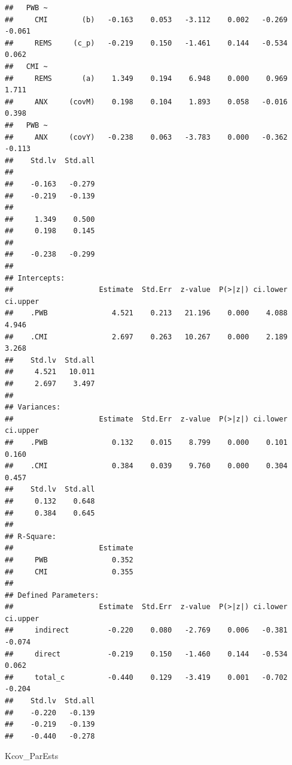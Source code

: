 \documentclass[
  11pt,
]{book}
\newenvironment{Shaded}{\begin{snugshade}}{\end{snugshade}}
\newcommand{\NormalTok}[1]{#1}
\begin{document}
\begin{verbatim}
##   PWB ~                                                                 
##     CMI        (b)   -0.163    0.053   -3.112    0.002   -0.269   -0.061
##     REMS     (c_p)   -0.219    0.150   -1.461    0.144   -0.534    0.062
##   CMI ~                                                                 
##     REMS       (a)    1.349    0.194    6.948    0.000    0.969    1.711
##     ANX     (covM)    0.198    0.104    1.893    0.058   -0.016    0.398
##   PWB ~                                                                 
##     ANX     (covY)   -0.238    0.063   -3.783    0.000   -0.362   -0.113
##    Std.lv  Std.all
##                   
##    -0.163   -0.279
##    -0.219   -0.139
##                   
##     1.349    0.500
##     0.198    0.145
##                   
##    -0.238   -0.299
## 
## Intercepts:
##                    Estimate  Std.Err  z-value  P(>|z|) ci.lower ci.upper
##    .PWB               4.521    0.213   21.196    0.000    4.088    4.946
##    .CMI               2.697    0.263   10.267    0.000    2.189    3.268
##    Std.lv  Std.all
##     4.521   10.011
##     2.697    3.497
## 
## Variances:
##                    Estimate  Std.Err  z-value  P(>|z|) ci.lower ci.upper
##    .PWB               0.132    0.015    8.799    0.000    0.101    0.160
##    .CMI               0.384    0.039    9.760    0.000    0.304    0.457
##    Std.lv  Std.all
##     0.132    0.648
##     0.384    0.645
## 
## R-Square:
##                    Estimate
##     PWB               0.352
##     CMI               0.355
## 
## Defined Parameters:
##                    Estimate  Std.Err  z-value  P(>|z|) ci.lower ci.upper
##     indirect         -0.220    0.080   -2.769    0.006   -0.381   -0.074
##     direct           -0.219    0.150   -1.460    0.144   -0.534    0.062
##     total_c          -0.440    0.129   -3.419    0.001   -0.702   -0.204
##    Std.lv  Std.all
##    -0.220   -0.139
##    -0.219   -0.139
##    -0.440   -0.278
\end{verbatim}

\begin{Shaded}
\begin{Highlighting}[]
\NormalTok{Kcov\_ParEsts}
\end{Highlighting}
\end{Shaded}
\end{document}
